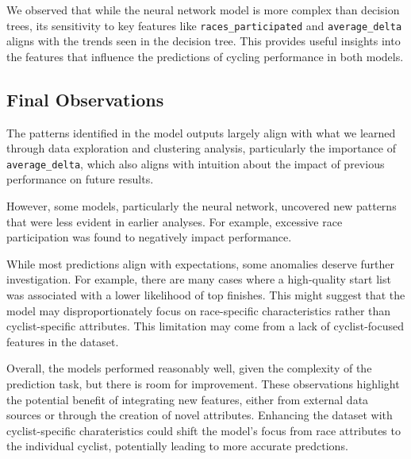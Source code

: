 \documentclass{article}
\begin{document}
We observed that while the neural network model is more complex than decision trees, its sensitivity to key features like \texttt{races\_participated} and \texttt{average\_delta} aligns with the trends seen in the decision tree. This provides useful insights into the features that influence the predictions of cycling performance in both models.



















\subsection{Final Observations}
The patterns identified in the model outputs largely align with what we learned through data exploration and clustering analysis, particularly the importance of \texttt{average\_delta}, which also aligns with intuition about the impact of previous performance on future results. 

However, some models, particularly the neural network, uncovered new patterns that were less evident in earlier analyses. For example, excessive race participation was found to negatively impact performance.

While most predictions align with expectations, some anomalies deserve further investigation. For example, there are many cases where a high-quality start list was associated with a lower likelihood of top finishes. This might suggest that the model may disproportionately focus on race-specific characteristics rather than cyclist-specific attributes. This limitation may come from a lack of cyclist-focused features in the dataset.

Overall, the models performed reasonably well, given the complexity of the prediction task, but there is room for improvement. These observations highlight the potential benefit of integrating new features, either from external data sources or through the creation of novel attributes. Enhancing the dataset with cyclist-specific charateristics could shift the model’s focus from race attributes to the individual cyclist, potentially leading to more accurate predctions.
\end{document}
